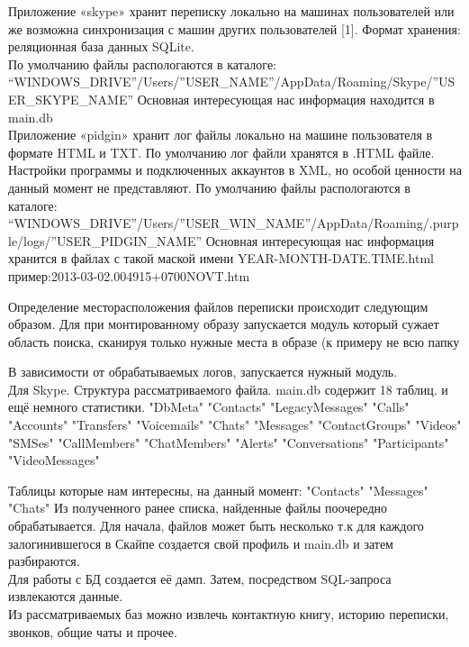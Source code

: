 Приложение «skype» хранит переписку локально на машинах пользователей или же возможна синхронизация с машин других пользователей [1]. Формат хранения: реляционная база данных SQLite.\\

По умолчанию файлы распологаются в каталоге: “WINDOWS_DRIVE”/Users/”USER_NAME”/AppData/Roaming/Skype/”USER_SKYPE_NAME”
Основная интересующая нас информация находится в main.db\\

Приложение «pidgin» хранит лог файлы локально на машине пользователя в формате HTML и TXT. По умолчанию лог файли хранятся в .HTML файле. Настройки программы и подключенных аккаунтов в XML, но особой ценности на данный момент не представляют.
По умолчанию файлы распологаются в каталоге: “WINDOWS_DRIVE”/Users/”USER_WIN_NAME”/AppData/Roaming/.purple/logs/”USER_PIDGIN_NAME”
Основная интересующая нас информация хранится в файлах с такой маской имени YEAR-MONTH-DATE.TIME.html пример:2013-03-02.004915+0700NOVT.htm\\


Определение месторасположения файлов переписки происходит следующим образом. Для при монтированному образу запускается модуль который сужает область поиска, сканируя только нужные места в образе (к примеру не всю папку %
\\


В зависимости от обрабатываемых логов, запускается нужный модуль.\\ 
Для Skype.
Структура рассматриваемого файла.
main.db  содержит 18 таблиц. и ещё немного статистики.
"DbMeta"   "Contacts"   "LegacyMessages"
"Calls"     "Accounts"   "Transfers"   
"Voicemails"   "Chats"      "Messages"   
"ContactGroups"   "Videos"   "SMSes"
"CallMembers"   "ChatMembers"   "Alerts"
"Conversations"     "Participants"   "VideoMessages"

Таблицы которые нам интересны, на данный момент:    
 "Contacts"    "Messages"    "Chats" 
Из полученного ранее списка, найденные файлы поочередно обрабатывается. Для начала, файлов может быть несколько т.к для каждого залогинившегося в Скайпе создается свой профиль и main.db и затем разбираются.\\
Для работы с БД создается её дамп. Затем, посредством SQL-запроса извлекаются данные.\\
Из рассматриваемых баз можно извлечь контактную книгу, историю переписки, звонков, общие чаты и прочее.\\


